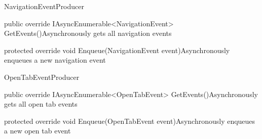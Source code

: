 \begin{class}{NavigationEventProducer} 
    


    \begin{methods}
        \begin{method}{public override IAsyncEnumerable<NavigationEvent> GetEvents()}{Asynchronously gets all navigation events}
        \end{method}
        \begin{method}{ protected override void Enqueue(NavigationEvent event)}{Asynchronously enqueues a new navigation event}
            \begin{parameters}
            \end{parameters}
        \end{method}
    \end{methods}
\end{class}

\begin{class}{OpenTabEventProducer} 
    


    \begin{methods}
        \begin{method}{public override IAsyncEnumerable<OpenTabEvent> GetEvents()}{Asynchronously gets all open tab events}
        \end{method}
        \begin{method}{ protected override void Enqueue(OpenTabEvent event)}{Asynchronously enqueues a new open tab event}
            \begin{parameters}
            \end{parameters}
        \end{method}
    \end{methods}
\end{class}


